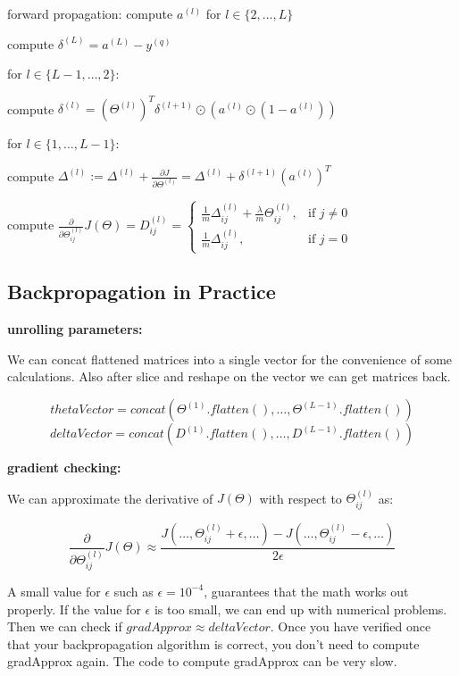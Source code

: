 \documentclass{article}
\begin{document}
\hspace{.5cm} forward propagation: compute \(a^{(l)}\) for \(l \in \{2, \dots, L\}\)

\hspace{.5cm} compute \(\delta^{(L)} = a^{(L)} - y^{(q)}\)

\hspace{.5cm} for \(l \in \{L - 1, \dots, 2\}\):

\hspace{1cm} compute \(\delta^{(l)} = (\Theta^{(l)})^T \delta^{(l + 1)} \odot (a^{(l)} \odot (1 - a^{(l)}))\)

\hspace{.5cm} for \(l \in \{1, \dots, L - 1\}\):

\hspace{1cm} compute \(\Delta^{(l)} := \Delta^{(l)} + \frac{\partial J}{\partial \Theta^{(l)}} = \Delta^{(l)} + \delta^{(l + 1)}(a^{(l)})^T\)

compute \(\frac{\partial}{\partial \Theta_{ij}^{(l)}} J(\Theta) = D_{ij}^{(l)} = 
\begin{cases}
  \frac{1}{m} \Delta_{ij}^{(l)} + \frac{\lambda}{m} \Theta_{ij}^{(l)}, & \text{if } j \neq 0 \\
  \frac{1}{m} \Delta_{ij}^{(l)}, & \text{if } j = 0
\end{cases}
\)

\subsection{Backpropagation in Practice}

\textbf{unrolling parameters:}

We can concat flattened matrices into a single vector for the convenience of some calculations. Also after slice and reshape on the vector we can get matrices back.

\[thetaVector = concat(\Theta^{(1)}.flatten(), \dots, \Theta^{(L - 1)}.flatten())\]
\[deltaVector = concat(D^{(1)}.flatten(), \dots, D^{(L - 1)}.flatten())\]

\textbf{gradient checking:}

We can approximate the derivative of \(J(\Theta)\) with respect to \(\Theta_{ij}^{(l)}\) as:

\[\frac{\partial}{\partial \Theta_{ij}^{(l)}} J(\Theta) \approx \frac{J(\dots, \Theta_{ij}^{(l)} + \epsilon, \dots) - J(\dots, \Theta_{ij}^{(l)} - \epsilon, \dots)}{2\epsilon}\]

A small value for \(\epsilon\) such as \(\epsilon = 10^{-4}\), guarantees that the math works out properly. If the value for \(\epsilon\) is too small, we can end up with numerical problems. Then we can check if \(gradApprox \approx deltaVector\). Once you have verified once that your backpropagation algorithm is correct, you don't need to compute gradApprox again. The code to compute gradApprox can be very slow.
 
\end{document}
